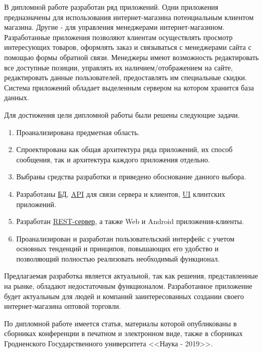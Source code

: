 \indent

В дипломной работе разработан ряд приложений.
Одни приложения предназначены для использования интернет-магазина потенциальным клиентом магазина.
Другие -  для управления менеджерами интернет-магазином.
Разработанные приложения позволяют клиентам осуществлять просмотр интересующих товаров, оформлять заказ и связываться с менеджерами сайта с помощью формы обратной связи.
Менеджеры имеют возможность редактировать все доступные позиции, управлять их наличием/отображением на сайте, редактировать данные пользователей, предоставлять им специальные скидки.
Система приложений обладает выделенным сервером на котором хранится база данных.

Для достижения цели дипломной работы были решены следующие задачи.
\begin{enumerate}
    \item Проанализирована предметная область.
    \item Спроектирована как общая архитектура ряда приложений, их способ сообщения, так и архитектура каждого приложения отдельно.
    \item Выбраны средства разработки и приведено обоснование данного выбора.
    \item Разработаны \hyperlink{gloss:db}{БД}, \hyperlink{gloss:api}{API} для связи сервера и клиентов, \hyperlink{gloss:ui}{UI} клинтских приложений.
    \item Разработан \hyperlink{gloss:rest}{REST-сервер}, а также Web и Android приложения-клиенты.
    \item Проанализирован и разработан пользовательский интерфейс с учетом основных тенденций и принципов, повышающих его удобство и позволяющий полностью реализовать необходимый функционал.
\end{enumerate}

Предлагаемая разработка является актуальной, так как решения, представленные на рынке, обладают недостаточным функционалом.
Разработанное приложение будет актуальным для людей и компаний заинтересованных создании своего интернет-магазина оптовой торговли.

По дипломной работе имеется статья, материалы которой опубликованы в сборниках конференции в печатном и электронном виде, 
также в сборниках Гродненского Государственного университета <<Наука - 2019>>.
